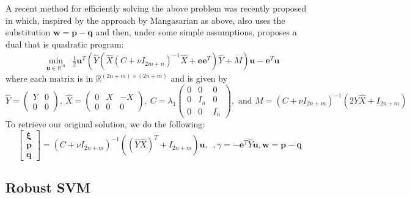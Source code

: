 \documentclass[11pt]{article}
\newcommand{\ds}{\displaystyle}
\begin{document}
A recent method for efficiently solving the above problem was recently proposed in \cite{pqsvm} which, inspired by the approach by Mangasarian as above, also uses the substitution $\bm{w} = \bm{p} - \bm{q}$ and then, under some simple assumptions, proposes a dual that is quadratic program:
\begin{eqnarray*}
& \ds\min_{\bm{u}\in\mathbb{R}^m} & \frac{1}{2}\bm{u}^T\left( \hat{Y}\left(\hat{X}\left(C + \nu I_{2m+n}\right)^{-1}\hat{X} + \bm{e}\bm{e}^T\right)\hat{Y} + M\right)\bm{u} - \bm{e}^T\bm{u}
\end{eqnarray*}
where each matrix is in $\mathbb{R}^{(2n+m)\times(2n+m)}$ and is given by
\[
\hat{Y} = \begin{pmatrix} Y & 0 \\ 0 & 0 \end{pmatrix}, \ \hat{X} = \begin{pmatrix} 0 & X & -X \\ 0 & 0 & 0 \end{pmatrix}, \ C = \lambda_1\begin{pmatrix} 0 & 0 & 0 \\ 0 & I_n & 0 \\ 0 & 0 & I_n \end{pmatrix}, \mbox{ and } M = (C+\nu I_{2n+m})^{-1}(2\hat{Y}\hat{X}+I_{2n+m})
\]
To retrieve our original solution, we do the following:
\[
\begin{bmatrix} \bm{\xi} \\ \bm{p} \\ \bm{q} \end{bmatrix} = (C + \nu I_{2n+m})^{-1}((\hat{Y}\hat{X})^T + I_{2n+m})\bm{u}, \enspace, \gamma = -\bm{e}^T\hat{Y}\bm{u}, \bm{w} = \bm{p} - \bm{q}
\]

\subsection{Robust SVM \cite{rsvm}}
\end{document}
